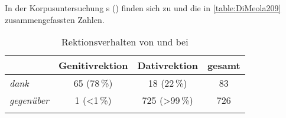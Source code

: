 In der Korpusuntersuchung \citeauthor{DiMeola2000}s (\citeyear{DiMeola2000}) finden sich zu  und  die in \autoref{table:DiMeola209} zusammengefassten Zahlen. 
\begin{table}
\centering
\begin{tabular}{llll}
\lsptoprule
      & Genitivrektion                 & Dativrektion                   & gesamt                  \\
      \midrule
\textit{dank}   & \multicolumn{1}{c}{65 (78\,\%)} & \multicolumn{1}{c}{18 (22\,\%)} & \multicolumn{1}{c}{83} \\
\textit{gegenüber} & \multicolumn{1}{c}{1 (<1\,\%)} & \multicolumn{1}{c}{725 (>99\,\%)}   & \multicolumn{1}{c}{726} \\
\lspbottomrule
\end{tabular}
\caption{Rektionsverhalten von  und  bei \citet[209]{DiMeola2000}}
\label{table:DiMeola209}
\end{table}


